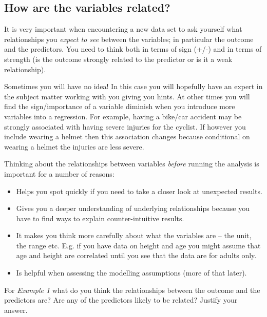 \documentclass[
]{gitbook}
\providecommand{\tightlist}{%
  \setlength{\itemsep}{0pt}\setlength{\parskip}{0pt}}
\begin{document}

\hypertarget{how-are-the-variables-related}{%
\subsection{How are the variables related?}\label{how-are-the-variables-related}}

It is very important when encountering a new data set to ask yourself what relationships you \emph{expect to see} between the variables; in particular the outcome and the predictors. You need to think both in terms of sign (+/-) and in terms of strength (is the outcome strongly related to the predictor or is it a weak relationship).

Sometimes you will have no idea! In this case you will hopefully have an expert in the subject matter working with you giving you hints. At other times you will find the sign/importance of a variable diminish when you introduce more variables into a regression. For example, having a bike/car accident may be strongly associated with having severe injuries for the cyclist. If however you include wearing a helmet then this association changes because conditional on wearing a helmet the injuries are less severe.

Thinking about the relationships between variables \emph{before} running the analysis is important for a number of reasons:

\begin{itemize}
\tightlist
\item
  Helps you spot quickly if you need to take a closer look at unexpected results.
\item
  Gives you a deeper understanding of underlying relationships because you have to find ways to explain counter-intuitive results.
\item
  It makes you think more carefully about what the variables are -- the unit, the range etc. E.g. if you have data on height and age you might assume that age and height are correlated until you see that the data are for adults only.
\item
  Is helpful when assessing the modelling assumptions (more of that later).
\end{itemize}

For \emph{Example 1} what do you think the relationships between the outcome and the predictors are? Are any of the predictors likely to be related? Justify your answer.
\end{document}

